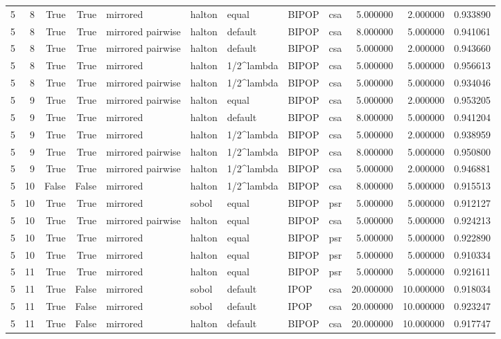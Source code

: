 \begin{tabular}{rrrrlllllrrr}
5 & 8 & True & True & mirrored & halton & equal & BIPOP & csa & 5.000000 & 2.000000 & 0.933890 \\
5 & 8 & True & True & mirrored pairwise & halton & default & BIPOP & csa & 8.000000 & 5.000000 & 0.941061 \\
5 & 8 & True & True & mirrored pairwise & halton & default & BIPOP & csa & 5.000000 & 2.000000 & 0.943660 \\
5 & 8 & True & True & mirrored & halton & 1/2^lambda & BIPOP & csa & 5.000000 & 5.000000 & 0.956613 \\
5 & 8 & True & True & mirrored pairwise & halton & 1/2^lambda & BIPOP & csa & 5.000000 & 5.000000 & 0.934046 \\
5 & 9 & True & True & mirrored pairwise & halton & equal & BIPOP & csa & 5.000000 & 2.000000 & 0.953205 \\
5 & 9 & True & True & mirrored & halton & default & BIPOP & csa & 8.000000 & 5.000000 & 0.941204 \\
5 & 9 & True & True & mirrored & halton & 1/2^lambda & BIPOP & csa & 5.000000 & 2.000000 & 0.938959 \\
5 & 9 & True & True & mirrored pairwise & halton & 1/2^lambda & BIPOP & csa & 8.000000 & 5.000000 & 0.950800 \\
5 & 9 & True & True & mirrored pairwise & halton & 1/2^lambda & BIPOP & csa & 5.000000 & 2.000000 & 0.946881 \\
5 & 10 & False & False & mirrored & halton & 1/2^lambda & BIPOP & csa & 8.000000 & 5.000000 & 0.915513 \\
5 & 10 & True & True & mirrored & sobol & equal & BIPOP & psr & 5.000000 & 5.000000 & 0.912127 \\
5 & 10 & True & True & mirrored pairwise & halton & equal & BIPOP & csa & 5.000000 & 5.000000 & 0.924213 \\
5 & 10 & True & True & mirrored & halton & equal & BIPOP & psr & 5.000000 & 5.000000 & 0.922890 \\
5 & 10 & True & True & mirrored & halton & equal & BIPOP & psr & 5.000000 & 5.000000 & 0.910334 \\
5 & 11 & True & True & mirrored & halton & equal & BIPOP & psr & 5.000000 & 5.000000 & 0.921611 \\
5 & 11 & True & False & mirrored & sobol & default & IPOP & csa & 20.000000 & 10.000000 & 0.918034 \\
5 & 11 & True & False & mirrored & sobol & default & IPOP & csa & 20.000000 & 10.000000 & 0.923247 \\
5 & 11 & True & False & mirrored & halton & default & BIPOP & csa & 20.000000 & 10.000000 & 0.917747 \\

\end{tabular}
